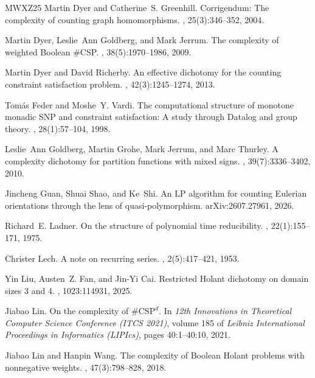 \documentclass[11pt,letterpaper,onecolumn]{article}
\theoremstyle{plain}
\theoremstyle{definition}
\theoremstyle{remark}
\begin{document}
\begin{thebibliography}{MWXZ25}
Martin Dyer and Catherine~S. Greenhill.
\newblock Corrigendum: The complexity of counting graph homomorphisms.
, 25(3):346--352, 2004.

Martin Dyer, Leslie~Ann Goldberg, and Mark Jerrum.
\newblock The complexity of weighted {Boolean} {{\#CSP}}.
, 38(5):1970--1986, 2009.

Martin Dyer and David Richerby.
\newblock An effective dichotomy for the counting constraint satisfaction
  problem.
, 42(3):1245--1274, 2013.

Tom{\'a}s Feder and Moshe~Y. Vardi.
\newblock The computational structure of monotone monadic {SNP} and constraint
  satisfaction: A study through {Datalog} and group theory.
, 28(1):57--104, 1998.

Leslie~Ann Goldberg, Martin Grohe, Mark Jerrum, and Marc Thurley.
\newblock A complexity dichotomy for partition functions with mixed signs.
, 39(7):3336--3402, 2010.

Jincheng Guan, Shuai Shao, and Ke~Shi.
\newblock An {LP} algorithm for counting {Eulerian} orientations through the
  lens of quasi-polymorphism.
\newblock arXiv:2607.27961, 2026.

Richard~E. Ladner.
\newblock On the structure of polynomial time reducibility.
, 22(1):155--171, 1975.

Christer Lech.
\newblock A note on recurring series.
, 2(5):417--421, 1953.

Yin Liu, Austen~Z. Fan, and Jin-Yi Cai.
\newblock Restricted {Holant} dichotomy on domain sizes 3 and 4.
, 1023:114931, 2025.

Jiabao Lin.
\newblock On the complexity of {$\#\mathrm{CSP}^{d}$}.
\newblock In {\em 12th Innovations in Theoretical Computer Science Conference
  (ITCS 2021)}, volume 185 of {\em Leibniz International Proceedings in
  Informatics (LIPIcs)}, pages 40:1--40:10, 2021.

Jiabao Lin and Hanpin Wang.
\newblock The complexity of {Boolean} {Holant} problems with nonnegative
  weights.
, 47(3):798--828, 2018.


\end{thebibliography}
\end{document}
